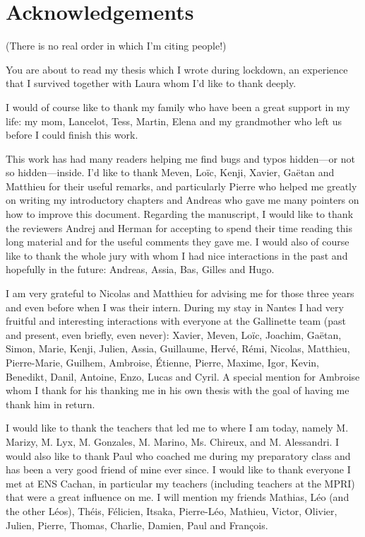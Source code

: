 \chapter{Acknowledgements}

(There is no real order in which I'm citing people!)

You are about to read my thesis which I wrote during lockdown, an experience
that I survived together with Laura whom I'd like to thank deeply.

I would of course like to thank my family who have been a great support in my
life: my mom, Lancelot, Tess, Martin, Elena and my grandmother who left us before
I could finish this work.


This work has had many readers helping me find bugs and typos hidden---or not
so hidden---inside. I'd like to thank Meven, Loïc, Kenji, Xavier, Gaëtan and
Matthieu for their useful remarks, and particularly Pierre who helped me greatly
on writing my introductory chapters and Andreas who gave me many pointers on how
to improve this document.
Regarding the manuscript, I would like to thank the reviewers Andrej and Herman
for accepting to spend their time reading this long material and for the useful
comments they gave me.
I would also of course like to thank the whole jury with whom I had nice
interactions in the past and hopefully in the future: Andreas, Assia, Bas,
Gilles and Hugo.


I am very grateful to Nicolas and Matthieu for advising me for those three years
and even before when I was their intern. During my stay in Nantes I had very
fruitful and interesting interactions with everyone at the Gallinette team (past
and present, even briefly, even never): Xavier, Meven, Loïc, Joachim, Gaëtan,
Simon, Marie, Kenji, Julien, Assia, Guillaume, Hervé, Rémi, Nicolas, Matthieu,
Pierre-Marie, Guilhem, Ambroise, Étienne, Pierre, Maxime, Igor, Kevin, Benedikt,
Danil, Antoine, Enzo, Lucas and Cyril.
A special mention for Ambroise whom I thank for his thanking me in his own
thesis with the goal of having me thank him in return.


I would like to thank the teachers that led me to where I am today, namely
M. Marizy, M. Lyx, M. Gonzales, M. Marino, Ms. Chireux, and M. Alessandri.
I would also like to thank Paul who coached me during my preparatory class
and has been a very good friend of mine ever since.
I would like to thank everyone I met at ENS Cachan, in particular my teachers
(including teachers at the MPRI) that were a great influence on me. I will
mention my friends Mathias, Léo (and the other Léos), Théis, Félicien, Itsaka,
Pierre-Léo, Mathieu, Victor, Olivier, Julien, Pierre, Thomas, Charlie, Damien,
Paul and François.


